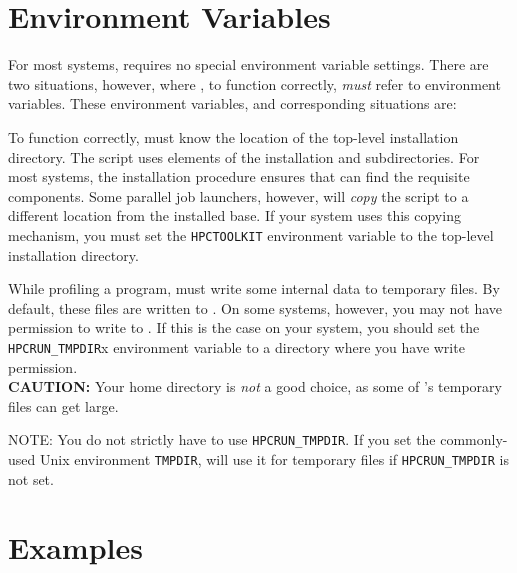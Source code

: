 \documentclass[english]{article}
\begin{document}

\section{Environment Variables}
For most systems,  requires no special environment variable settings.
There are two situations, however, where , to function correctly,
\emph{must} refer to environment variables. These environment variables, and
corresponding situations are:
\begin{Description}
  \item[\verb+HPCTOOLKIT+] To function correctly,  must know
       the location of the  top-level installation directory.
       The  script uses elements of the installation  and
        subdirectories. For most systems, the 
       installation procedure ensures that  can find the requisite
       components. Some parallel job launchers, however, will \emph{copy} the
        script to a different location from the installed base. If your
       system uses this copying mechanism, you must set the \verb+HPCTOOLKIT+
       environment variable to the top-level installation directory.
  \item[\verb+HPCRUN_TMPDIR+] While profiling a program,  must
       write some internal data to temporary files. By default, these files
       are written to . On some systems, however, you may not
       have permission to write to . If this is the case on your system,
       you should set the \verb+HPCRUN_TMPDIR+x environment variable to a directory
       where you have write permission. \\
       \textbf{CAUTION:} Your home directory is \emph{not}
       a good choice, as some of 's temporary files can get large.

       NOTE: You do not strictly have to use \verb+HPCRUN_TMPDIR+. If you set the
       commonly-used Unix environment \verb+TMPDIR+,  will use it for
       temporary files if \verb+HPCRUN_TMPDIR+ is not set.
\end{Description}


\section{Examples}
\end{document}
